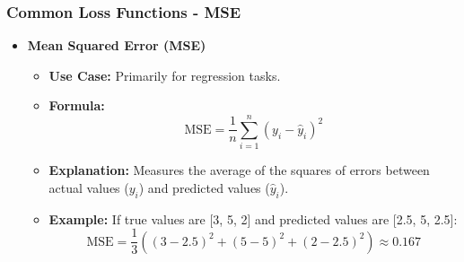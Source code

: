 \documentclass[aspectratio=169]{beamer}
\begin{document}
\begin{frame}[fragile]
  \frametitle{Common Loss Functions - MSE}
  \begin{itemize}
    \item \textbf{Mean Squared Error (MSE)}
    \begin{itemize}
      \item \textbf{Use Case:} Primarily for regression tasks.
      \item \textbf{Formula:}
      \begin{equation}
        \text{MSE} = \frac{1}{n} \sum_{i=1}^{n} (y_i - \hat{y}_i)^2
      \end{equation}
      \item \textbf{Explanation:} Measures the average of the squares of errors between actual values (\(y_i\)) and predicted values (\(\hat{y}_i\)).
      \item \textbf{Example:} If true values are [3, 5, 2] and predicted values are [2.5, 5, 2.5]:
      \begin{equation}
        \text{MSE} = \frac{1}{3} \left((3-2.5)^2 + (5-5)^2 + (2-2.5)^2\right) \approx 0.167
      \end{equation}
    \end{itemize}
  \end{itemize}
\end{frame}
\end{document}
